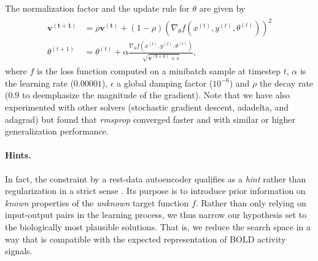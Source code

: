 \documentclass{article} %
\begin{document}
The normalization factor and the update rule for $\theta$
are given by
%
\begin{eqnarray}
  \begin{split}
    \mathbf{v^{(t+1)}} &= \rho \mathbf{v^{(t)}} + (1 - \rho)\left(\nabla_{\theta} f(x^{(t)}, y^{(t)}, \theta^{(t)})\right)^2
\\
\theta^{(t+1)} &= \theta^{(t)} + \alpha \frac{\nabla_{\theta} f(x^{(t)}, y^{(t)}, \theta^{(t)})}{\sqrt{\mathbf{v^{(t+1)}} + \epsilon}},
  \end{split}
\end{eqnarray}
where $f$ is the loss function computed on a minibatch sample at timestep $t$,
$\alpha$ is the learning rate ($0.00001$),
$\epsilon$ a global damping factor ($10^{-6}$)
and
$\rho$ the decay rate ($0.9$ to deemphasize the magnitude of the gradient).
%
Note that we have also experimented with other solvers
(stochastic gradient descent, adadelta, and adagrad) but found that
\textit{rmsprop} converged faster and with
similar or higher generalization performance.

\paragraph{Hints.}
In fact, the constraint by a rest-data autoencoder qualifies as a
\textit{hint}
rather than regularization in a strict sense \cite{abu1994hints}.
Its purpose is to introduce
prior information on
\textit{known} properties of the \textit{unknown} target function $f$.
Rather than only relying on input-output pairs in the learning process,
we thus narrow our hypothesis set to the biologically most plausible solutions.
That is, we reduce the search space in a way that
is compatible with the expected representation of BOLD activity signals.
\end{document}
